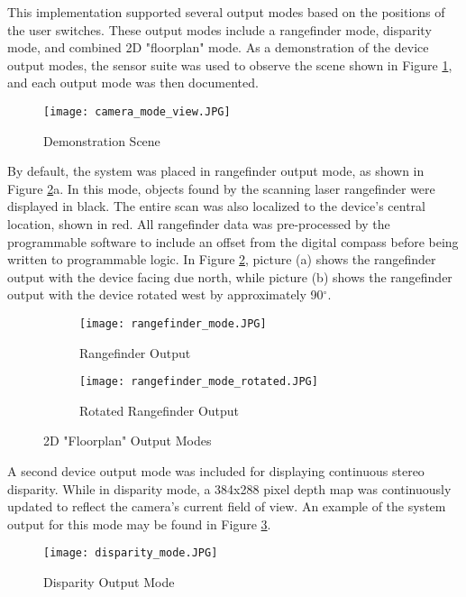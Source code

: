 \par
This implementation supported several output modes based on the positions of the user switches. These output modes include a rangefinder mode, disparity mode, and combined 2D "floorplan" mode. As a demonstration of the device output modes, the sensor suite was used to observe the scene shown in Figure \ref{demoScene}, and each output mode was then documented.
\par
\begin{figure}[H]
	\centerline{
	\texttt{[image: camera\_mode\_view.JPG]}
	}
	\caption{Demonstration Scene}
	\label{demoScene}
\end{figure}
\par
By default, the system was placed in rangefinder output mode, as shown in Figure \ref{rangeOutputs}a. In this mode, objects found by the scanning laser rangefinder were displayed in black. The entire scan was also localized to the device's central location, shown in red. All rangefinder data was pre-processed by the programmable software to include an offset from the digital compass before being written to programmable logic. In Figure \ref{rangeOutputs}, picture (a) shows the rangefinder output with the device facing due north, while picture (b) shows the rangefinder output with the device rotated west by approximately 90$^\circ$.
\par
\begin{figure}[H]
\centering
       \begin{subfigure}[h]{1\textwidth}
            \centerline{\texttt{[image: rangefinder\_mode.JPG]}}
           \caption{Rangefinder Output}
       \end{subfigure}
       \begin{subfigure}[h]{1\textwidth}
           \centerline{\texttt{[image: rangefinder\_mode\_rotated.JPG]}}
           \caption{Rotated Rangefinder Output}
       \end{subfigure}
\caption{2D "Floorplan" Output Modes}
\label{rangeOutputs}
\end{figure}
\par
A second device output mode was included for displaying continuous stereo disparity. While in disparity mode, a 384x288 pixel depth map was continuously updated to reflect the camera's current field of view. An example of the system output for this mode may be found in Figure \ref{disparityOutputs}.
\begin{figure}[H]
        \centerline{\texttt{[image: disparity\_mode.JPG]}}
        \caption{Disparity Output Mode}
        \label{disparityOutputs}
\end{figure}
